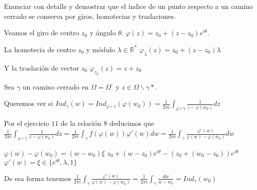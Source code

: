 \begin{ejer}
	Enunciar con detalle y demostrar que el índice de un punto respecto a un camino cerrado
	se conserva por giros, homotecias y traslaciones.
\end{ejer}

\begin{sol}
Veamos el giro de centro $z_0$ y ángulo $\theta$.
$\varphi(z) = z_0 + (z-z_0)e^{i\theta}$.

La homotecia de centro $z_0$ y módulo $\lambda\in\mathbb{R}^{\ast}$
$\varphi_{\lambda}(z) = z_0 + (z-z_0)\lambda$

Y la traslación de vector $z_0$
$\varphi_{z_0} (z) = z+z_0$

Sea $\gamma$ un camino cerrado en $\Omega=\Omega^{\circ}$
y $z\in\Omega\backslash\gamma{\ast}$.

Queremos ver si  $Ind_{\gamma}(w)=Ind_{\varphi\circ\gamma} (\varphi(w_0)) = \frac{1}{2\pi i} \int_{\varphi\circ\gamma} \frac{1}{z-\varphi(w_0)} dz$
 
Por el ejercicio $11$ de la relación $8$ deducimos que
$\frac{1}{2\pi i} \int_{\varphi\circ\gamma} \frac{1}{z-\varphi(w_0)} dz = \frac{1}{2\pi i} \int_{\gamma} f(\varphi(w))\varphi'(w) dw = \frac{1}{2\pi i} \int_{\gamma} \frac{\varphi'(w)}{\varphi(w)-\varphi(w_0)} dw$

$\varphi(w)-\varphi(w_0) = (w-w_0) \xi$
$z_0+(w-z_0)e^{i\theta}-(z_0+(w_0-z_0))e^{i\theta}$
$\varphi'(w) = \xi \in \{ e^{i\theta},\lambda,1 \}$

De esa forma tenemos 
$\frac{1}{2\pi i} \int_{\gamma} \frac{\varphi'(w)}{\varphi(w)-\varphi(w_0)} = \frac{1}{2\pi i} \int_{\gamma} \frac{dw}{w-w_0} = Ind_{\gamma}(w_0)$
\end{sol}


